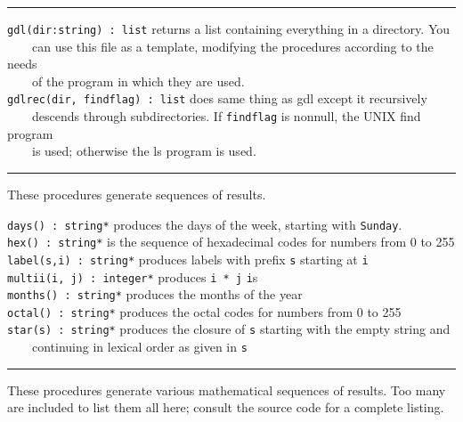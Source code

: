 \vspace{0.25cm}\hrule{}

\texttt{gdl(dir:string) : list} returns a list containing everything in
a directory. You\\
 \ \ \ \ can use this file as a template, modifying the procedures
according to the needs\\
 \ \ \ \ of the program in which they are used.\\
\texttt{gdlrec(dir, findflag) : list} does same thing as gdl except it
recursively\\
 \ \ \ \ descends through subdirectories. If \texttt{findflag} is
nonnull, the UNIX {\textquotedbl}find{\textquotedbl} program\\
 \ \ \ \ is used; otherwise the {\textquotedbl}ls{\textquotedbl} program
is used.

\vspace{0.25cm}\hrule{}

These procedures generate sequences of results. 

\texttt{days() : string*} produces the days of
the week, starting with
\texttt{{\textquotedbl}Sunday{\textquotedbl}}.\\
\texttt{hex() : string*} is the sequence of
hexadecimal codes for numbers from 0 to 255\\
\texttt{label(s,i) : string*} produces labels with prefix \texttt{s}
starting at \texttt{i}\\
\texttt{multii(i, j) : integer*} produces \texttt{i * j}
\texttt{i}{\textquotesingle}s\\
\texttt{months() : string*} produces the months of the year\\
\texttt{octal() : string*} produces the octal codes for
numbers from 0 to 255\\
\texttt{star(s) : string*} produces the closure of \texttt{s} starting with the
empty string and\\
 \ \ \ \ continuing in lexical order as given in \texttt{s} 

\vspace{0.25cm}\hrule{}

These procedures generate various mathematical
sequences of results. Too many are included to list
them all here; consult the source code for a complete listing.

